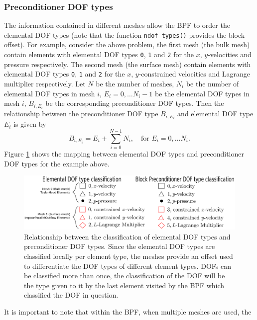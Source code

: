 \subsubsection{Preconditioner DOF types}
The information contained in different meshes allow the BPF to order the elemental
DOF types (note that the function \texttt{ndof\_\allowbreak types()} provides 
the block offset). For example, consider the above problem, 
the first mesh (the bulk mesh) contain elements with elemental DOF types 
\texttt{0}, \texttt{1} and \texttt{2} for the $x$, $y$-velocities and pressure
respectively. The second mesh (the surface mesh) contain elements with elemental
DOF types \texttt{0}, \texttt{1} and \texttt{2} for the $x$, $y$-constrained 
velocities and Lagrange multiplier respectively. Let $N$ be the 
number of meshes, $N_i$ be the number of elemental DOF types in mesh $i$,
$E_i = 0, \ldots N_i - 1$ be the elemental DOF types in mesh $i$, $B_{i,E_i}$ 
be the corresponding preconditioner DOF types. Then the relationship 
between the preconditioner DOF type $B_{i,E_i}$ and elemental DOF type
$E_i$ is given by
\begin{equation*}
  B_{i,E_i} = E_i + \sum_{i=0}^{N - 1} N_i, \quad \mbox{for } E_i = 0,\ldots N_i.
\end{equation*}
Figure \ref{fig:elemental_to_block_dof_classification_val} shows the mapping between
elemental DOF types and preconditioner DOF types for the example above.
\begin{figure}[H]
\centering
\includegraphics[width=1\textwidth]{./pic/elemental_to_block_dof_classification.pdf}
\caption{Relationship between the classification of elemental DOF types and
  preconditioner DOF types. Since the elemental DOF types are classified
  locally per element type, the meshes provide an offset used to differentiate
  the DOF types of different element types. DOFs can be classified more than
  once, the classification of the DOF will be the type given to it by the last
  element visited by the BPF which classified the DOF in question.}
\label{fig:elemental_to_block_dof_classification_val}
\end{figure}
It is important to note that within the BPF, when multiple meshes are used, the
